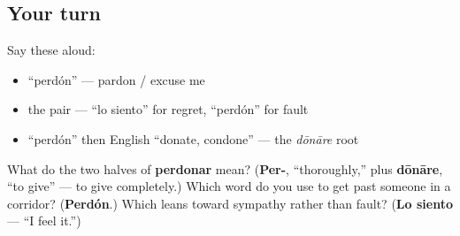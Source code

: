 \subsection*{Your turn}
Say these aloud:

\begin{itemize}
\raggedright
  \item \textquotedblleft{}perdón\textquotedblright{} — pardon / excuse me
  \item the pair — \textquotedblleft{}lo siento\textquotedblright{} for regret, \textquotedblleft{}perdón\textquotedblright{} for fault
  \item \textquotedblleft{}perdón\textquotedblright{} then English \textquotedblleft{}donate, condone\textquotedblright{} — the \emph{dōnāre} root
\end{itemize}

\begin{tcolorbox}[breakable,colback=teal!4,colframe=teal!35!black,title={Before you move on}]
What do the two halves of \textbf{perdonar} mean? (\textbf{Per-}, \textquotedblleft{}thoroughly,\textquotedblright{} plus \textbf{dōnāre}, \textquotedblleft{}to give\textquotedblright{} — to give completely.) Which word do you use to get past someone in a corridor? (\textbf{Perdón}.) Which leans toward sympathy rather than fault? (\textbf{Lo siento} — \textquotedblleft{}I feel it.\textquotedblright{})
\end{tcolorbox}

